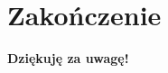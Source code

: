 \section*{Zakończenie}

\begin{frame}
    \centering
    \vspace*{\fill}
    
    {\Huge \textbf{Dziękuję za uwagę!}}
    
    \vspace*{\fill}
\end{frame}